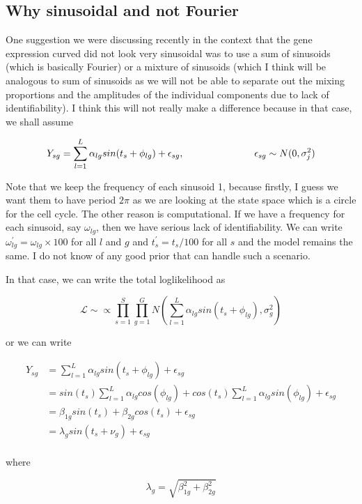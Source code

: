 \documentclass[11pt]{article}
\begin{document}
\subsection{Why sinusoidal and not Fourier}

One suggestion we were discussing recently in the context that the gene expression curved did not look very sinusoidal was to use  a sum of sinusoids (which is basically Fourier) or a mixture of sinusoids (which I think will be analogous to sum of sinusoids as we will not be able to separate out the mixing proportions and the amplitudes of the individual components due to lack of identifiability). I think this will not really make a difference because in that case, we shall assume 

$$ Y_{sg} = \sum_{l=1}^{L} \alpha_{lg} sin (t_s + \phi_{lg})  +\epsilon_{sg}, \hspace{1 in}  \epsilon_{sg} \sim N(0, \sigma^2_j)  $$

Note that we keep the frequency of each sinusoid 1, because firstly, I guess we want them to have period $2 \pi$ as we are looking at the state space which is a circle for the cell cycle. The other reason is computational. If we have a frequency for each sinusoid, say $\omega_{lg}$, then we have serious lack of identifiability. We can write $\omega^{'}_{lg} = \omega_{lg} \times 100$ for all $l$ and $g$ and $t^{'}_s = t_s/100$ for all $s$ and the model remains the same. I do not know of any good prior that can handle such a scenario.

In that case, we can write the total loglikelihood as 

$$ \mathcal{L} \sim  \propto \prod_{s=1}^{S} \prod_{g=1}^{G} N ( \sum_{l=1}^{L}  \alpha_{lg} sin (t_s + \phi_{lg}), \sigma^2_{g} ) $$

or we can write 

\begin{align*}
Y_{sg}  & =  \sum_{l=1}^{L}  \alpha_{lg} sin (t_s + \phi_{lg}) + \epsilon_{sg}  \\
	    & = sin(t_s) \sum_{l=1}^{L} \alpha_{lg} cos(\phi_{lg}) + cos(t_s) \sum_{l=1}^{L} \alpha_{lg} sin(\phi_{lg}) + \epsilon_{sg}\\
	    & = \beta_{1g} sin(t_s) + \beta_{2g} cos(t_s)  + \epsilon_{sg}\\
	    & =  \lambda_g sin (t_s + \nu_g)  + \epsilon_{sg}\\
\end{align*}

where 

$$ \lambda_{g} = \sqrt{\beta^2_{1g} +  \beta^2_{2g}} $$
\end{document}
